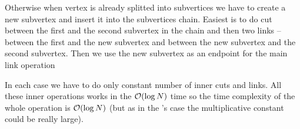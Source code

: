 Otherwise when vertex is already splitted into subvertices we have to create a
new subvertex and insert it into the subvertices chain. Easiest is to do cut
between the first and the second subvertex in the chain and then two links --
between the first and the new subvertex and between the new subvertex and the
second subvertex. Then we use the new subvertex as an endpoint for the main link
operation

In each case we have to do only constant number of inner cuts and links. All
these inner operations works in the ${\cal O}(\log N)$ time so the time complexity of
the whole \Link{} operation is ${\cal O}(\log N)$ (but as in the \Cut's case the
multiplicative constant could be really large).

